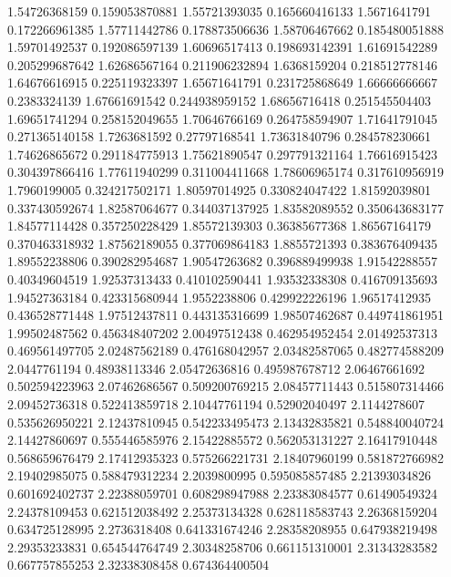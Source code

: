   1.54726368159   0.159053870881
  1.55721393035   0.165660416133
   1.5671641791   0.172266961385
  1.57711442786   0.178873506636
  1.58706467662   0.185480051888
  1.59701492537   0.192086597139
  1.60696517413   0.198693142391
  1.61691542289   0.205299687642
  1.62686567164   0.211906232894
   1.6368159204   0.218512778146
  1.64676616915   0.225119323397
  1.65671641791   0.231725868649
  1.66666666667     0.2383324139
  1.67661691542   0.244938959152
  1.68656716418   0.251545504403
  1.69651741294   0.258152049655
  1.70646766169   0.264758594907
  1.71641791045   0.271365140158
   1.7263681592    0.27797168541
  1.73631840796   0.284578230661
  1.74626865672   0.291184775913
  1.75621890547   0.297791321164
  1.76616915423   0.304397866416
  1.77611940299   0.311004411668
  1.78606965174   0.317610956919
   1.7960199005   0.324217502171
  1.80597014925   0.330824047422
  1.81592039801   0.337430592674
  1.82587064677   0.344037137925
  1.83582089552   0.350643683177
  1.84577114428   0.357250228429
  1.85572139303    0.36385677368
  1.86567164179   0.370463318932
  1.87562189055   0.377069864183
   1.8855721393   0.383676409435
  1.89552238806   0.390282954687
  1.90547263682   0.396889499938
  1.91542288557    0.40349604519
  1.92537313433   0.410102590441
  1.93532338308   0.416709135693
  1.94527363184   0.423315680944
   1.9552238806   0.429922226196
  1.96517412935   0.436528771448
  1.97512437811   0.443135316699
  1.98507462687   0.449741861951
  1.99502487562   0.456348407202
  2.00497512438   0.462954952454
  2.01492537313   0.469561497705
  2.02487562189   0.476168042957
  2.03482587065   0.482774588209
   2.0447761194    0.48938113346
  2.05472636816   0.495987678712
  2.06467661692   0.502594223963
  2.07462686567   0.509200769215
  2.08457711443   0.515807314466
  2.09452736318   0.522413859718
  2.10447761194    0.52902040497
   2.1144278607   0.535626950221
  2.12437810945   0.542233495473
  2.13432835821   0.548840040724
  2.14427860697   0.555446585976
  2.15422885572   0.562053131227
  2.16417910448   0.568659676479
  2.17412935323   0.575266221731
  2.18407960199   0.581872766982
  2.19402985075   0.588479312234
   2.2039800995   0.595085857485
  2.21393034826   0.601692402737
  2.22388059701   0.608298947988
  2.23383084577    0.61490549324
  2.24378109453   0.621512038492
  2.25373134328   0.628118583743
  2.26368159204   0.634725128995
   2.2736318408   0.641331674246
  2.28358208955   0.647938219498
  2.29353233831   0.654544764749
  2.30348258706   0.661151310001
  2.31343283582   0.667757855253
  2.32338308458   0.674364400504
